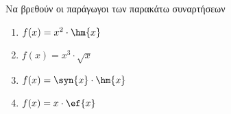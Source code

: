 Να βρεθούν οι παράγωγοι των παρακάτω συναρτήσεων
\begin{enumerate}
\item $ f(x)=x^2\cdot\hm{x} $
\item $ f(x)=x^3\cdot\sqrt{x} $
\item $ f(x)=\syn{x}\cdot\hm{x} $
\item $ f(x)=x\cdot\ef{x} $
\end{enumerate}
